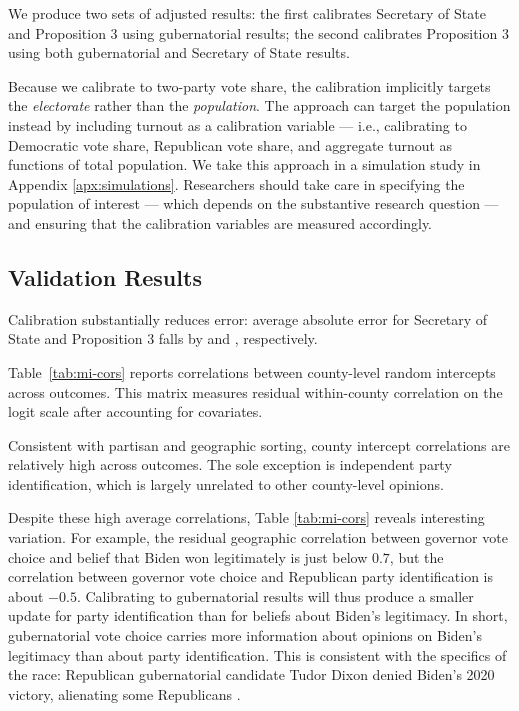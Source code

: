 We produce two sets of adjusted results: the first calibrates Secretary of State and Proposition 3 using gubernatorial results; the second calibrates Proposition 3 using both gubernatorial and Secretary of State results.

Because we calibrate to two-party vote share, the calibration implicitly targets the \textit{electorate} rather than the \textit{population}. 
The approach can target the population instead by including turnout as a calibration variable --- i.e., calibrating to Democratic vote share, Republican vote share, and aggregate turnout as functions of total population. 
We take this approach in a simulation study in Appendix \ref{apx:simulations}.
Researchers should take care in specifying the population of interest --- which depends on the substantive research question --- and ensuring that the calibration variables are measured accordingly.



\subsection{Validation Results}

Calibration substantially reduces error: average absolute error for Secretary of State and Proposition 3 falls by  and , respectively. %


Table~\ref{tab:mi-cors} reports correlations between county-level random intercepts across outcomes. This matrix measures residual within-county correlation on the logit scale after accounting for covariates.

\begin{table}[tb]
	\centering
	\caption{Correlation of County Intercepts Across Outcomes, Michigan 2022}
	\label{tab:mi-cors}
	\resizebox{\textwidth}{!}{}
\end{table}

Consistent with partisan and geographic sorting, county intercept correlations are relatively high across outcomes.
The sole exception is independent party identification, which is largely unrelated to other county-level opinions.

Despite these high average correlations, Table \ref{tab:mi-cors} reveals interesting variation. 
For example, the residual geographic correlation between governor vote choice and belief that Biden won legitimately is just below $0.7$, but the correlation between governor vote choice and Republican party identification is about $-0.5$. 
Calibrating to gubernatorial results will thus produce a smaller update for party identification than for beliefs about Biden's legitimacy.
In short, gubernatorial vote choice carries more information about opinions on Biden's legitimacy than about party identification.
This is consistent with the specifics of the race: Republican gubernatorial candidate Tudor Dixon denied Biden's 2020 victory, alienating some Republicans \citep{U:2022}. 

